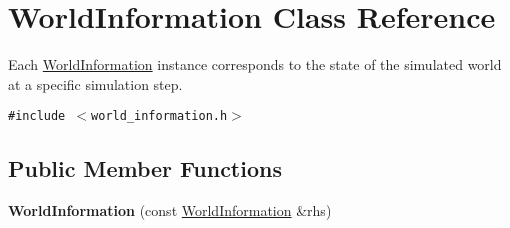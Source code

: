 \hypertarget{class_world_information}{
\section{WorldInformation Class Reference}
\label{class_world_information}
}
Each \hyperlink{class_world_information}{WorldInformation} instance corresponds to the state of the simulated world at a specific simulation step.  


{\tt \#include $<$world\_\-information.h$>$}

\subsection*{Public Member Functions}
\begin{CompactItemize}
\item 
\hypertarget{class_world_information_e0bcb5d40722db2d3f088b8b55b57089}{
\textbf{WorldInformation} (const \hyperlink{class_world_information}{WorldInformation} \&rhs)}
\label{class_world_information_e0bcb5d40722db2d3f088b8b55b57089}


\end{CompactItemize}
